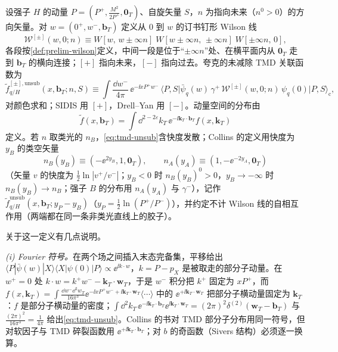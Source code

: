 \begin{definition}\label{def:tmd-unsub}
设强子 $H$ 的动量 $P=(P^+,\frac{M^2}{2P^+},\mathbf 0_T)$、自旋矢量 $S$，$n$ 为指向未来（$n^0>0$）的方向矢量。对 $w=(0^+,w^-,\mathbf b_T)$ 定义从 $0$ 到 $w$ 的订书钉形 Wilson 线
\begin{equation}\label{eq:tmd-staple}
\mathcal W^{[\pm]}(w,0;n)\equiv W[w,\,w\pm\infty n]\;W[w\pm\infty n,\,\pm\infty n]\;W[\pm\infty n,\,0],
\end{equation}
各段按\cref{def:prelim-wilson}定义，中间一段是位于“$\pm\infty n$”处、在横平面内从 $\mathbf 0_T$ 走到 $\mathbf b_T$ 的横向连接；$[+]$ 指向未来，$[-]$ 指向过去。夸克的未减除 TMD 关联函数为
\begin{equation}\label{eq:tmd-unsub}
\tilde f^{[\pm],\mathrm{unsub}}_{q/H}(x,\mathbf b_T;n,S)\equiv\int\frac{\dd w^-}{4\pi}\,\ee^{-\ii xP^+w^-}\,\big\langle P,S\big|\bar\psi_q(w)\,\gamma^+\,\mathcal W^{[\pm]}(w,0;n)\,\psi_q(0)\big|P,S\big\rangle_{\mathrm c},
\end{equation}
对颜色求和；SIDIS 用 $[+]$，Drell--Yan 用 $[-]$。动量空间的分布由
\begin{equation}\label{eq:tmd-fourier}
\tilde f(x,\mathbf b_T)=\int\dd^{2-2\varepsilon}k_T\,\ee^{-\ii\mathbf k_T\cdot\mathbf b_T}f(x,\mathbf k_T)
\end{equation}
定义。若 $n$ 取类光的 $n_B$，\cref{eq:tmd-unsub}含快度发散；Collins 的定义用快度为 $y_B$ 的类空矢量
\begin{equation}\label{eq:tmd-nB}
n_B(y_B)\equiv(-\ee^{2y_B},1,\mathbf 0_T),\qquad n_A(y_A)\equiv(1,-\ee^{-2y_A},\mathbf 0_T)
\end{equation}
（矢量 $v$ 的快度为 $\frac12\ln|v^+/v^-|$；$y_B<0$ 时 $n_B(y_B)^0>0$，$y_B\to-\infty$ 时 $n_B(y_B)\to n_B$；强子 $B$ 的分布用 $n_A(y_A)$ 与 $\gamma^-$），记作 $\tilde f^{\mathrm{unsub}}_{q/H}(x,\mathbf b_T;y_P-y_B)$（$y_P=\frac12\ln(P^+/P^-)$），并约定不计 Wilson 线的自相互作用（两端都在同一条非类光直线上的胶子）。
\end{definition}

关于这一定义有几点说明。

\emph{(i) Fourier 符号。}在两个场之间插入末态完备集，平移给出 $\langle P|\bar\psi(w)|X\rangle\langle X|\psi(0)|P\rangle\propto\ee^{\ii k\cdot w}$，$k=P-p_X$ 是被取走的部分子动量。在 $w^+=0$ 处 $k\cdot w=k^+w^--\mathbf k_T\cdot\mathbf w_T$，于是 $w^-$ 积分把 $k^+$ 固定为 $xP^+$，而 $f(x,\mathbf k_T)=\int\frac{\dd w^-\dd^2w_T}{16\pi^3}\ee^{-\ii xP^+w^-+\ii\mathbf k_T\cdot\mathbf w_T}\langle\cdots\rangle$ 中的 $\ee^{+\ii\mathbf k_T\cdot\mathbf w_T}$ 把部分子横动量固定为 $\mathbf k_T$：$f$ 是部分子横动量的密度；$\int\dd^2k_T\,\ee^{-\ii\mathbf k_T\cdot\mathbf b_T}\ee^{\ii\mathbf k_T\cdot\mathbf w_T}=(2\pi)^2\delta^{(2)}(\mathbf w_T-\mathbf b_T)$ 与 $\frac{(2\pi)^2}{16\pi^3}=\frac1{4\pi}$ 给出\cref{eq:tmd-unsub}。Collins 的书对 TMD 部分子分布用同一符号，但对软因子与 TMD 碎裂函数用 $\ee^{+\ii\mathbf k_T\cdot\mathbf b_T}$\cite[式~(13.35)]{Collins2011}；对 $b$ 的奇函数（Sivers 结构）必须逐一换算。

